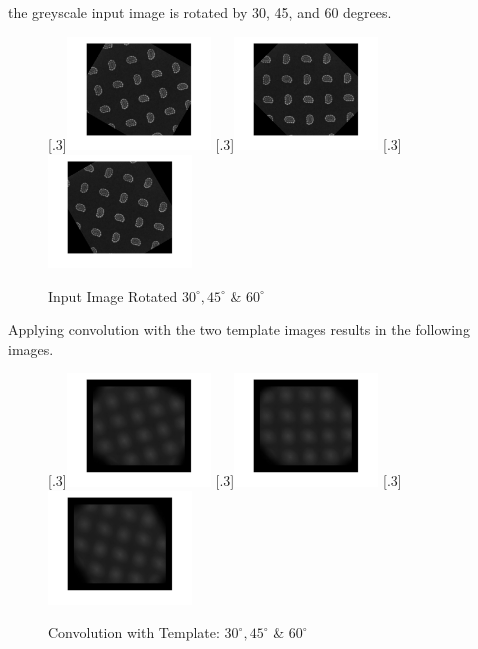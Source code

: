 \documentclass[a4paper]{article}
\begin{document}
	the greyscale input image is rotated by 30, 45, and 60 degrees.
	\begin{figure}[H]
		\centering
		[.3\linewidth]{\includegraphics[height=3cm]{Results/Q3/a/qaInputRot30.jpg}}%
		[.3\linewidth]{\includegraphics[height=3cm]{Results/Q3/a/qaInputRot45.jpg}}%
		[.3\linewidth]{\includegraphics[height=3cm]{Results/Q3/a/qaInputRot60.jpg}}%
		\caption{Input Image Rotated $30^\circ, 45^\circ$ \& $60^\circ$}
		\label{fig:}
	\end{figure}
	Applying convolution with the two template images results in the
	following images.
	\begin{figure}[H]
		\centering
		[.3\linewidth]{\includegraphics[height=3cm]{Results/Q3/a/qaConv1-30.jpg}}%
		[.3\linewidth]{\includegraphics[height=3cm]{Results/Q3/a/qaConv1-45.jpg}}%
		[.3\linewidth]{\includegraphics[height=3cm]{Results/Q3/a/qaConv1-60.jpg}}%
		\caption{Convolution with Template: $30^\circ, 45^\circ$ \& $60^\circ$}
		\label{fig:}
	\end{figure}
\end{document}
